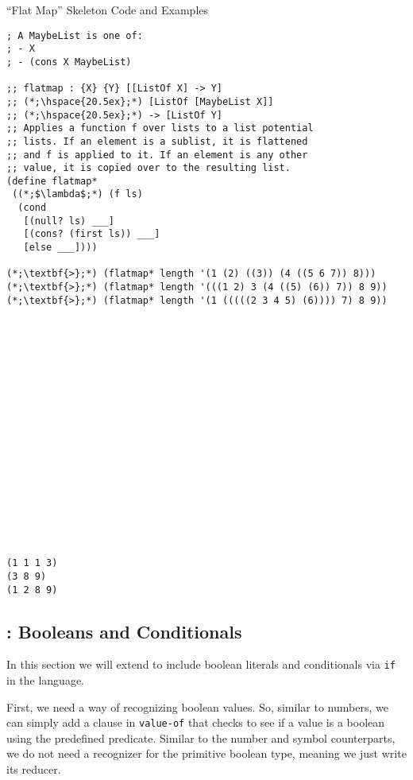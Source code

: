 \begin{clonarrow}[]{``Flat Map'' Skeleton Code and Examples}
\begin{lstlisting}[language=MyScheme]
; A MaybeList is one of:
; - X
; - (cons X MaybeList)

;; flatmap : {X} {Y} [[ListOf X] -> Y] 
;; (*;\hspace{20.5ex};*) [ListOf [MaybeList X]] 
;; (*;\hspace{20.5ex};*) -> [ListOf Y]
;; Applies a function f over lists to a list potential 
;; lists. If an element is a sublist, it is flattened 
;; and f is applied to it. If an element is any other 
;; value, it is copied over to the resulting list.
(define flatmap*
 ((*;$\lambda$;*) (f ls)
  (cond
   [(null? ls) ___]
   [(cons? (first ls)) ___]
   [else ___])))

(*;\textbf{>};*) (flatmap* length '(1 (2) ((3)) (4 ((5 6 7)) 8)))
(*;\textbf{>};*) (flatmap* length '(((1 2) 3 (4 ((5) (6)) 7)) 8 9))
(*;\textbf{>};*) (flatmap* length '(1 (((((2 3 4 5) (6)))) 7) 8 9))
\end{lstlisting}
\tcblower
\begin{lstlisting}[language=MyOutput]


















(1 1 1 3)
(3 8 9)
(1 2 8 9)
\end{lstlisting}
\end{clonarrow}

\clearpage
\subsection*{: Booleans and Conditionals}

In this section we will extend  to include boolean literals and conditionals via \texttt{if} in the  language.

First, we need a way of recognizing boolean values. So, similar to numbers, we can simply add a clause in \texttt{value-of} that checks to see if a value is a boolean using the predefined predicate. Similar to the number and symbol counterparts, we do not need a recognizer for the primitive boolean type, meaning we just write its reducer.

